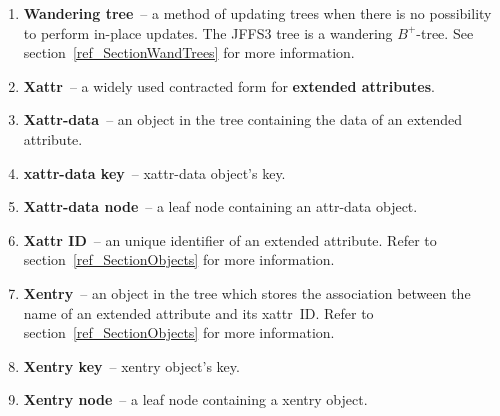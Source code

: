 \begin{enumerate}
\item \textbf{Wandering tree}~-- a method of updating trees when there is no
possibility to perform \mbox{in-place} updates. The JFFS3 tree is a wandering
\mbox{$B^+$-tree}. See section~\ref{ref_SectionWandTrees} for more information.

\item \textbf{Xattr}~-- a widely used contracted form for \textbf{extended
attributes}.

\item \textbf{Xattr-data}~-- an object in the tree containing the data of an
extended attribute.

\item \textbf{xattr-data key}~-- xattr-data object's key.

\item \textbf{Xattr-data node}~-- a leaf node containing an \mbox{attr-data}
object.

\item \textbf{Xattr ID}~-- an unique identifier of an extended attribute. Refer to
section~\ref{ref_SectionObjects} for more information.

\item \textbf{Xentry}~-- an object in the tree which stores the association
between the name of an extended attribute and its xattr~ID. Refer to
section~\ref{ref_SectionObjects} for more information.

\item \textbf{Xentry key}~-- xentry object's key.

\item \textbf{Xentry node}~-- a leaf node containing a xentry object.

\end{enumerate}


